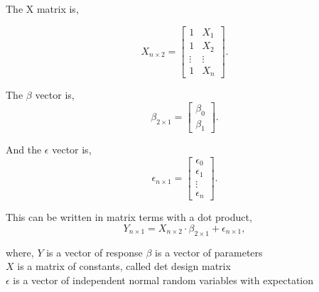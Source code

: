 \noindent The X matrix is, 

\begin{equation}X_{n \times 2}=
\left[
\begin{array}{cc}
	1 & X_1 \\ 
	1 & X_2 \\ 
	\vdots & \vdots \\
	1 & X_n
\end{array}
\right].
\end{equation}


\noindent The $\beta$ vector is, 
\begin{equation}\beta_{2 \times 1} =
\left[
\begin{array}{c}
	\beta_0 \\ 
	\beta_1 
\end{array}
\right].
\end{equation}

\noindent And the $\epsilon$ vector is,
\begin{equation} \epsilon_{n \times 1} =
\left[
\begin{array}{c}
	\epsilon_0 \\ 
	\epsilon_1 \\
	\vdots \\
	\epsilon_n 
\end{array}
\right].
\end{equation}

\noindent This can be written in matrix terms with a dot product, 
\begin{equation} Y_{n \times 1}=X_{n \times 2} \cdot \beta_{2 \times 1} + \epsilon_{n \times 1} ,
\end{equation}

\noindent where, \newline
\textbf{$Y$} is a vector of response \newline
\textbf{$\beta$} is a vector of parameters \\
\textbf{$X$} is a matrix of constants, called det design matrix\\
\textbf{$\epsilon$} is a vector of independent normal random variables with expectation\\

